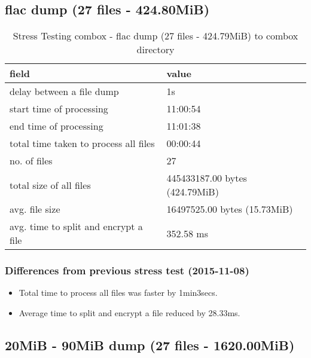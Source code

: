 \subsection{flac dump (27 files - 424.80MiB)}\label{4-st-424}

\begin{center}
\begin{table}[h]
\begin{tabular}{ll}
field & value\\
\hline
delay between a file dump & 1s\\
start time of processing & 11:00:54\\
end time of processing & 11:01:38\\
total time taken to process all files & 00:00:44\\
no. of files & 27\\
total size of all files & 445433187.00 bytes (424.79MiB)\\
avg. file size & 16497525.00 bytes (15.73MiB)\\
avg. time to split and encrypt a file & 352.58 ms\\
\end{tabular}
\caption{Stress Testing combox - flac dump (27 files - 424.79MiB) to combox directory}
\end{table}
\end{center}

\subsubsection{Differences from previous stress test (2015-11-08)}

\begin{itemize}
\item Total time to process all files was faster by 1min3secs.
\item Average time to split and encrypt a file reduced by
  28.33ms.
\end{itemize}

\subsection{20MiB - 90MiB dump (27 files - 1620.00MiB)}\label{4-st-1620}

